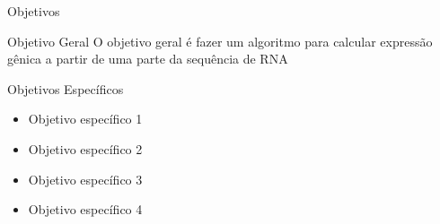\begin{frame}{Objetivos}
\begin{block}{Objetivo Geral}
O objetivo geral é fazer um algoritmo para calcular expressão gênica a partir de uma parte da sequência de RNA
\end{block}

\begin{block}{Objetivos Específicos}
\begin{itemize}
    \item Objetivo específico 1
    \item Objetivo específico 2
    \item Objetivo específico 3
    \item Objetivo específico 4
\end{itemize}
\end{block}

    
\end{frame}